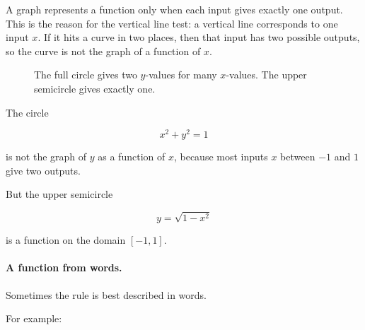 A graph represents a function only when each input gives exactly one output. This is the reason for the vertical line test: a vertical line corresponds to one input \(x\). If it hits a curve in two places, then that input has two possible outputs, so the curve is not the graph of a function of \(x\).

\begin{figure}[h]
\centering
{}
\caption{The full circle gives two \(y\)-values for many \(x\)-values. The upper semicircle gives exactly one.}
\label{fig:vertical-line-test}
\end{figure}

The circle

\[
x^2+y^2=1
\]

is not the graph of \(y\) as a function of \(x\), because most inputs \(x\) between \(-1\) and \(1\) give two outputs.

But the upper semicircle

\[
y=\sqrt{1-x^2}
\]

is a function on the domain \([-1,1]\).

\paragraph{A function from words.}
Sometimes the rule is best described in words.

For example:

